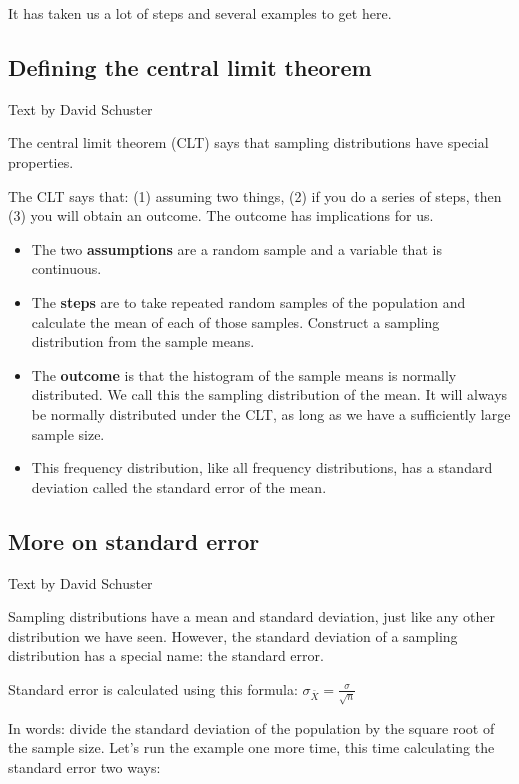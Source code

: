 \documentclass[
]{book}
\providecommand{\tightlist}{%
  \setlength{\itemsep}{0pt}\setlength{\parskip}{0pt}}
\begin{document}
It has taken us a lot of steps and several examples to get here.

\hypertarget{defining-the-central-limit-theorem}{%
\subsection{Defining the central limit theorem}\label{defining-the-central-limit-theorem}}

Text by David Schuster

The central limit theorem (CLT) says that sampling distributions have special properties.

The CLT says that: (1) assuming two things, (2) if you do a series of steps, then (3) you will obtain an outcome. The outcome has implications for us.

\begin{itemize}
\tightlist
\item
  The two \textbf{assumptions} are a random sample and a variable that is continuous.
\item
  The \textbf{steps} are to take repeated random samples of the population and calculate the mean of each of those samples. Construct a sampling distribution from the sample means.
\item
  The \textbf{outcome} is that the histogram of the sample means is normally distributed. We call this the sampling distribution of the mean. It will always be normally distributed under the CLT, as long as we have a sufficiently large sample size.
\item
  This frequency distribution, like all frequency distributions, has a standard deviation called the standard error of the mean.
\end{itemize}

\hypertarget{more-on-standard-error}{%
\subsection{More on standard error}\label{more-on-standard-error}}

Text by David Schuster

Sampling distributions have a mean and standard deviation, just like any other distribution we have seen. However, the standard deviation of a sampling distribution has a special name: the standard error.

Standard error is calculated using this formula: \(\sigma_{\bar{X}}=\frac{\sigma}{\sqrt{n}}\)

In words: divide the standard deviation of the population by the square root of the sample size. Let's run the example one more time, this time calculating the standard error two ways:
\end{document}
